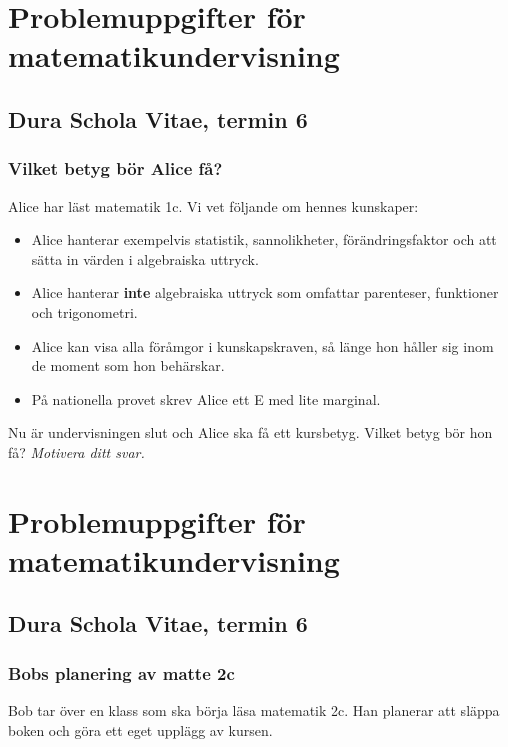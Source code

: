 \part*{Problemuppgifter för matematikundervisning}

\chapter{Dura Schola Vitae, termin 6}

\setcounter{section}{0}
\section{Vilket betyg bör Alice få?}
Alice har läst matematik 1c. Vi vet följande om hennes kunskaper:

\begin{itemize}
  \item Alice hanterar exempelvis statistik, sannolikheter, förändringsfaktor och att sätta in värden i algebraiska uttryck.
  \item Alice hanterar \textbf{inte} algebraiska uttryck som omfattar parenteser, funktioner och trigonometri.
  \item Alice kan visa alla föråmgor i kunskapskraven, så länge hon håller sig inom de moment som hon behärskar.
  \item På nationella provet skrev Alice ett E med lite marginal.
\end{itemize}

\noindent Nu är undervisningen slut och Alice ska få ett kursbetyg. Vilket betyg bör hon få? \emph{Motivera ditt svar.}



\newpage
\part*{Problemuppgifter för matematikundervisning}

\chapter{Dura Schola Vitae, termin 6}

\section{Bobs planering av matte 2c}
Bob tar över en klass som ska börja läsa matematik 2c. Han planerar att släppa boken och göra ett eget upplägg av kursen.

